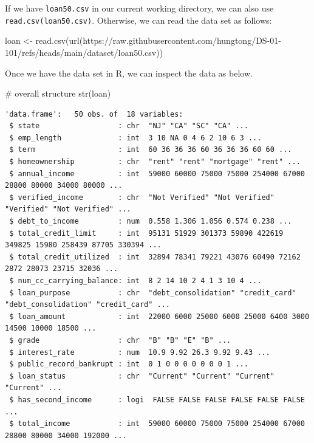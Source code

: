 \documentclass[
  letterpaper,
  DIV=11,
  numbers=noendperiod]{scrreprt}
\newenvironment{Shaded}{\begin{snugshade}}{\end{snugshade}}
\newcommand{\CommentTok}[1]{\textcolor[rgb]{0.37,0.37,0.37}{#1}}
\newcommand{\FunctionTok}[1]{\textcolor[rgb]{0.28,0.35,0.67}{#1}}
\newcommand{\NormalTok}[1]{\textcolor[rgb]{0.00,0.23,0.31}{#1}}
\newcommand{\OtherTok}[1]{\textcolor[rgb]{0.00,0.23,0.31}{#1}}
\newcommand{\StringTok}[1]{\textcolor[rgb]{0.13,0.47,0.30}{#1}}
\begin{document}
\begin{tcolorbox}[enhanced jigsaw, colbacktitle=quarto-callout-tip-color!10!white, opacitybacktitle=0.6, breakable, left=2mm, leftrule=.75mm, toprule=.15mm, toptitle=1mm, bottomtitle=1mm, colframe=quarto-callout-tip-color-frame, opacityback=0, coltitle=black, arc=.35mm, titlerule=0mm, colback=white, bottomrule=.15mm, title=\textcolor{quarto-callout-tip-color}{\faLightbulb}\hspace{0.5em}{Answer}, rightrule=.15mm]

If we have \texttt{loan50.csv} in our current working directory, we can
also use
\texttt{read.csv(\textquotesingle{}loan50.csv\textquotesingle{})}.
Otherwise, we can read the data set as follows:

\begin{Shaded}
\begin{Highlighting}[]
\NormalTok{loan }\OtherTok{\textless{}{-}} \FunctionTok{read.csv}\NormalTok{(}\FunctionTok{url}\NormalTok{(}\StringTok{\textquotesingle{}https://raw.githubusercontent.com/hungtong/DS{-}01{-}101/refs/heads/main/dataset/loan50.csv\textquotesingle{}}\NormalTok{))}
\end{Highlighting}
\end{Shaded}

Once we have the data set in R, we can inspect the data as below.

\begin{Shaded}
\begin{Highlighting}[]
\CommentTok{\# overall structure}
\FunctionTok{str}\NormalTok{(loan)}
\end{Highlighting}
\end{Shaded}

\begin{verbatim}
'data.frame':   50 obs. of  18 variables:
 $ state                  : chr  "NJ" "CA" "SC" "CA" ...
 $ emp_length             : int  3 10 NA 0 4 6 2 10 6 3 ...
 $ term                   : int  60 36 36 36 60 36 36 36 60 60 ...
 $ homeownership          : chr  "rent" "rent" "mortgage" "rent" ...
 $ annual_income          : int  59000 60000 75000 75000 254000 67000 28800 80000 34000 80000 ...
 $ verified_income        : chr  "Not Verified" "Not Verified" "Verified" "Not Verified" ...
 $ debt_to_income         : num  0.558 1.306 1.056 0.574 0.238 ...
 $ total_credit_limit     : int  95131 51929 301373 59890 422619 349825 15980 258439 87705 330394 ...
 $ total_credit_utilized  : int  32894 78341 79221 43076 60490 72162 2872 28073 23715 32036 ...
 $ num_cc_carrying_balance: int  8 2 14 10 2 4 1 3 10 4 ...
 $ loan_purpose           : chr  "debt_consolidation" "credit_card" "debt_consolidation" "credit_card" ...
 $ loan_amount            : int  22000 6000 25000 6000 25000 6400 3000 14500 10000 18500 ...
 $ grade                  : chr  "B" "B" "E" "B" ...
 $ interest_rate          : num  10.9 9.92 26.3 9.92 9.43 ...
 $ public_record_bankrupt : int  0 1 0 0 0 0 0 0 0 1 ...
 $ loan_status            : chr  "Current" "Current" "Current" "Current" ...
 $ has_second_income      : logi  FALSE FALSE FALSE FALSE FALSE FALSE ...
 $ total_income           : int  59000 60000 75000 75000 254000 67000 28800 80000 34000 192000 ...
\end{verbatim}


\end{tcolorbox}
\end{document}
